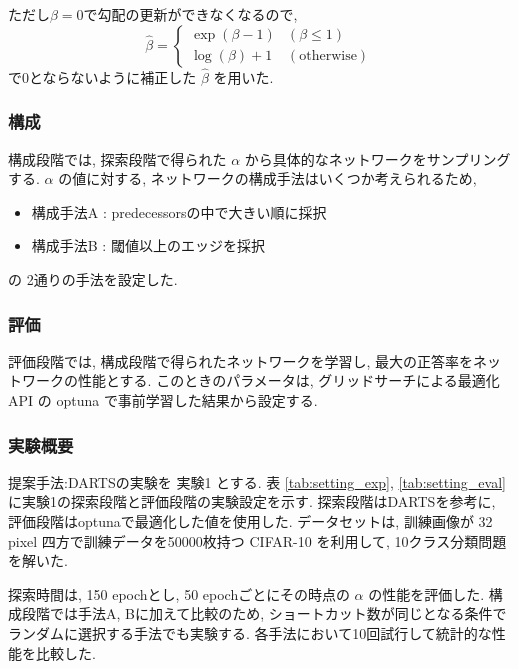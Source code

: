 ただし$\beta=0$で勾配の更新ができなくなるので,
\begin{equation}
  \label{equ:beta}
  \hat{\beta} = \begin{cases}
    \exp(\beta - 1) & (\beta \leq 1) \\
    \log(\beta) + 1 & (\mathrm{otherwise})
  \end{cases}
\end{equation}
で0とならないように補正した $\hat{\beta}$ を用いた.

\subsubsection{構成}

構成段階では, 探索段階で得られた $\alpha$ から具体的なネットワークをサンプリングする.
$\alpha$ の値に対する, ネットワークの構成手法はいくつか考えられるため,
\begin{itemize}
  \item 構成手法A : predecessorsの中で大きい順に採択
  \item 構成手法B : 閾値以上のエッジを採択
\end{itemize}
の 2通りの手法を設定した.

\subsubsection{評価}
評価段階では, 構成段階で得られたネットワークを学習し,
最大の正答率をネットワークの性能とする.
このときのパラメータは, グリッドサーチによる最適化API の optuna \cite{akiba2019optuna}
で事前学習した結果から設定する.


\changeindent{0cm}
\subsubsection{実験概要}
\label{sec:pred.01_03}
\changeindent{2cm}

提案手法:DARTSの実験を 実験1 とする.
表 \ref{tab:setting_exp}, \ref{tab:setting_eval} に実験1の探索段階と評価段階の実験設定を示す.
探索段階はDARTSを参考に, 評価段階はoptunaで最適化した値を使用した.
データセットは, 訓練画像が 32 pixel 四方で訓練データを50000枚持つ CIFAR-10\cite{cifar10} を利用して,
10クラス分類問題を解いた.

探索時間は, 150 epochとし, 50 epochごとにその時点の $\alpha$ の性能を評価した.
構成段階では手法A, Bに加えて比較のため,
ショートカット数が同じとなる条件でランダムに選択する手法でも実験する.
各手法において10回試行して統計的な性能を比較した.

